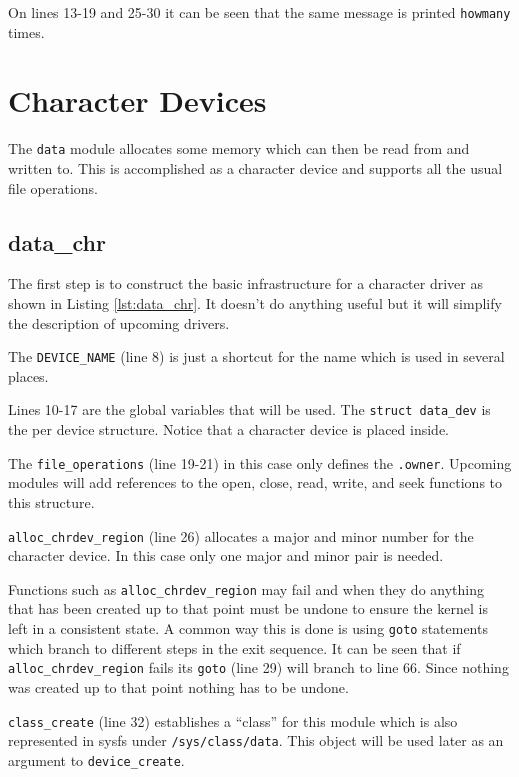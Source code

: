 \documentclass{article}
\begin{document}
On lines 13-19 and 25-30 it can be seen that the same message
is printed \verb+howmany+ times.

\clearpage
\section{Character Devices}

The \verb+data+ module allocates some memory which can
then be read from and written to.
This is accomplished as a character device and supports all
the usual file operations.

\subsection{data\_chr}
\label{sec:data_chr}

The first step is to construct the basic infrastructure for
a character driver as shown in Listing \ref{lst:data_chr}.
It doesn't do anything useful but it will simplify the description
of upcoming drivers.

The \verb+DEVICE_NAME+ (line 8) is just a shortcut for the
name which is used in several places.

Lines 10-17 are the global variables that will be used.
The \verb+struct data_dev+ is the per device structure.
Notice that a character device is placed inside.

The \verb+file_operations+ (line 19-21) in this case only
defines the \verb+.owner+.  Upcoming modules will add references
to the open, close, read, write, and seek functions to this structure.

\verb+alloc_chrdev_region+ (line 26) allocates a major and minor number
for the character device\autocite[Pg. 66]{corbet2009linux}.
In this case only one major and minor pair is needed.

Functions such as \verb+alloc_chrdev_region+ may fail and when they
do anything that has been created up to that point must be undone
to ensure the kernel is left in a consistent state.
A common way this is done is using \verb+goto+ statements which
branch to different steps in the exit
sequence\autocite[Pg. 53]{corbet2009linux}.
It can be seen that if \verb+alloc_chrdev_region+ fails its \verb+goto+
(line 29) will branch to line 66.
Since nothing was created up to that point nothing has to be undone.

\verb+class_create+ (line 32) establishes a ``class'' for this
module which is also represented in sysfs under \verb+/sys/class/data+.
This object will be used later as an argument to \verb+device_create+.
\end{document}
